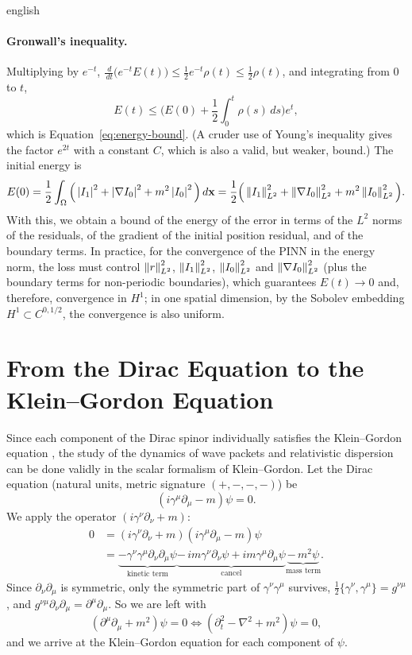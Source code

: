 \documentclass[../0000.tex]{subfiles}
\begin{document}
\begin{hyphenrules}{english}
\paragraph{Gronwall's inequality.}
Multiplying by $e^{-t}$, $\frac{\,d}{\,d t}\big(e^{-t}E(t)\big)\le\frac12e^{-t}\rho(t)\le\frac12\rho(t)$, and
integrating from $0$ to $t$,
\[
  E(t)\le\Big(E(0)+\frac12\int_0^t\rho(s)\,d s\Big)e^{t},
\]
which is Equation~\eqref{eq:energy-bound}. (A cruder use of Young's inequality gives the factor $e^{2t}$ with a constant $C$, which is also
a valid, but weaker, bound.) The initial energy is
\[
  E(0)=\frac12\int_\Omega\Big(\left\lvert I_1 \right\rvert^2+\left\lvert \nabla I_0 \right\rvert^2+m^2\left\lvert I_0 \right\rvert^2\Big)\,d\mathbf{x}
  =\frac12\Big(\left\lVert I_1 \right\rVert^2_{L^2}+\left\lVert \nabla I_0 \right\rVert^2_{L^2}+m^2\left\lVert I_0 \right\rVert^2_{L^2}\Big).
\]
With this, we obtain a bound of the energy of the error in terms of the $L^2$ norms of the residuals, of the
gradient of the initial position residual, and of the boundary terms. In practice, for the convergence of
the PINN in the energy norm, the loss must control $\left\lVert r \right\rVert^2_{L^2}$, $\left\lVert I_1 \right\rVert^2_{L^2}$,
$\left\lVert I_0 \right\rVert^2_{L^2}$ and $\left\lVert \nabla I_0 \right\rVert^2_{L^2}$ (plus the boundary terms for non-periodic boundaries),
which guarantees $E(t)\to0$ and, therefore, convergence in $H^1$; in one spatial dimension, by the Sobolev
embedding $H^1\subset C^{0,1/2}$, the convergence is also uniform.

\section{From the Dirac Equation to the Klein--Gordon Equation}\label{app:dirac}

Since each component of the Dirac spinor individually satisfies the Klein--Gordon equation
\cite{bjorken1964}, the study of the dynamics of wave packets and relativistic dispersion can be done
validly in the scalar formalism of Klein--Gordon. Let the Dirac equation (natural units, metric signature
$(+,-,-,-)$) be
\begin{equation}
  (i\gamma^{\mu}\partial_\mu-m)\psi=0.
  \label{eq:dirac}
\end{equation}
We apply the operator $(i\gamma^{\nu}\partial_\nu+m)$:
\begin{align*}
  0&=(i\gamma^{\nu}\partial_\nu+m)(i\gamma^{\mu}\partial_\mu-m)\psi\\
   &=\underbrace{-\gamma^{\nu}\gamma^{\mu}\partial_\nu\partial_\mu\psi}_{\text{kinetic term}}
     \underbrace{-\,i m\gamma^{\nu}\partial_\nu\psi+i m\gamma^{\mu}\partial_\mu\psi}_{\text{cancel}}
     \underbrace{-\,m^2\psi}_{\text{mass term}}.
\end{align*}
Since $\partial_\nu\partial_\mu$ is symmetric, only the symmetric part of $\gamma^{\nu}\gamma^{\mu}$ survives,
$\frac12\{\gamma^{\nu},\gamma^{\mu}\}=g^{\nu\mu}$, and $g^{\nu\mu}\partial_\nu\partial_\mu=\partial^{\mu}\partial_\mu$.
So we are left with
\[
  (\partial^{\mu}\partial_\mu+m^2)\psi=0\iff(\partial_t^2-\nabla^2+m^2)\psi=0,
\]
and we arrive at the Klein--Gordon equation for each component of $\psi$.

\end{hyphenrules}

\ifSubfilesClassLoaded{}{}
\end{document}
